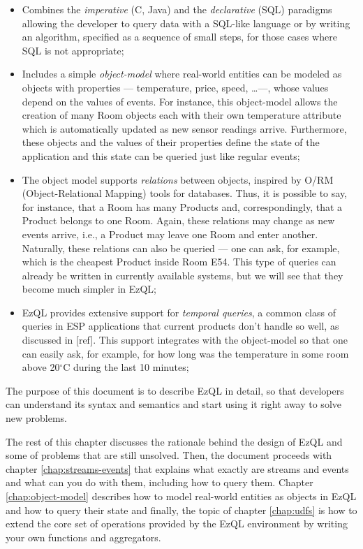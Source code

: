 \documentclass{report}
\begin{document}
\begin{itemize}
\item Combines the \emph{imperative} (C, Java) and the
  \emph{declarative} (SQL) paradigms allowing the developer to query
  data with a SQL-like language or by writing an algorithm, specified
  as a sequence of small steps, for those cases where SQL is not
  appropriate;
\item Includes a simple \emph{object-model} where real-world entities
  can be modeled as objects with properties --- temperature, price,
  speed, \ldots ---, whose values depend on the values of events. For
  instance, this object-model allows the creation of many Room objects
  each with their own temperature attribute which is automatically
  updated as new sensor readings arrive. Furthermore, these objects
  and the values of their properties define the state of the
  application and this state can be queried just like regular events;
\item The object model supports \emph{relations} between objects,
  inspired by O/RM (Object-Relational Mapping) tools for
  databases. Thus, it is possible to say, for instance, that a Room
  has many Products and, correspondingly, that a Product belongs to
  one Room. Again, these relations may change as new events arrive,
  i.e., a Product may leave one Room and enter another. Naturally,
  these relations can also be queried --- one can ask, for example,
  which is the cheapest Product inside Room E54. This type of queries
  can already be written in currently available systems, but we will
  see that they become much simpler in EzQL;
\item EzQL provides extensive support for \emph{temporal queries}, a
  common class of queries in ESP applications that current products
  don't handle so well, as discussed in [ref]. This support integrates
  with the object-model so that one can easily ask, for example, for
  how long was the temperature in some room above 20$^{\circ}$C during
  the last 10 minutes;
\end{itemize}

The purpose of this document is to describe EzQL in detail, so that
developers can understand its syntax and semantics and start using it
right away to solve new problems.

The rest of this chapter discusses the rationale behind the design of
EzQL and some of problems that are still unsolved. Then, the document
proceeds with chapter \ref{chap:streams-events} that explains what
exactly are streams and events and what can you do with them,
including how to query them. Chapter \ref{chap:object-model} describes
how to model real-world entities as objects in EzQL and how to query
their state and finally, the topic of chapter \ref{chap:udfs} is how
to extend the core set of operations provided by the EzQL environment
by writing your own functions and aggregators.
\end{document}
